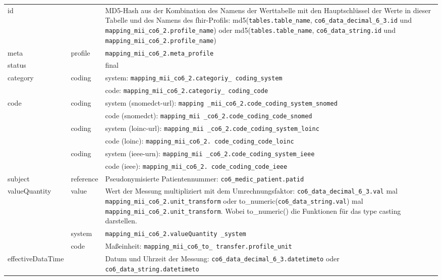 \begin{longtable}{|l|l|p{7.5cm}|} 
	\hline
	\rowcolor{lightgray} \multicolumn{3}{|l|}{Data Mapping (inhaltlich) - numerische und String Werte} \\ \hline
	id &  & MD5-Hash aus der Kombination des Namens der Werttabelle mit den Hauptschlüssel der Werte in dieser Tabelle und des Namens des \ac{fhir}-Profils: md5(\texttt{tables.table\_name}, \texttt{co6\_data\_decimal\_6\_3.id} und \texttt{mapping\_mii\_co6\_2.profile\_name}) oder md5(\texttt{tables.table\_name}, \texttt{co6\_data\_string.id} und \texttt{mapping\_mii\_co6\_2.profile\_name}) \\ \hline
	meta & profile & \texttt{mapping\_mii\_co6\_2.meta\_profile} \\ \hline 
	status &  & final  \\ \hline 
	category & coding & system: \texttt{mapping\_mii\_co6\_2.categoriy\_ coding\_system} \\ 
	\cline{3-3}
	& & code: \texttt{mapping\_mii\_co6\_2.categoriy\_ coding\_code} \\ \hline
	code & coding & system (\ac{snomedct}-\acs{url}): \texttt{mapping \_mii\_co6\_2.code\_coding\_system\_snomed} \\ 
	\cline{3-3} 
	 &   & code (\ac{snomedct}): \texttt{mapping\_mii \_co6\_2.code\_coding\_code\_snomed} \\
	 \cline{2-3} 
	 &  coding & system (\ac{loinc}-\ac{url}): \texttt{mapping\_mii \_co6\_2.code\_coding\_system\_loinc} \\ 
	 \cline{3-3} 
	  &  & code (\ac{loinc}): \texttt{mapping\_mii\_co6\_2. code\_coding\_code\_loinc} \\ 
	 \cline{2-3} 
	  & coding & system (\ac{ieee}-\acs{urn}): \texttt{mapping\_mii \_co6\_2.code\_coding\_system\_ieee} \\ 
	 \cline{3-3} 
	 &  & code (\ac{ieee}): \texttt{mapping\_mii\_co6\_2. code\_coding\_code\_ieee} \\ \hline
	subject & reference & Pseudonymisierte Patientennummer: \texttt{co6\_medic\_patient.patid} \\ \hline
	valueQuantity & value & Wert der Messung multipliziert mit dem Umrechnungsfaktor: \texttt{co6\_data\_decimal\_6\_3.val} mal \texttt{mapping\_mii\_co6\_2.unit\_transform} oder to\_numeric(\texttt{co6\_data\_string.val}) mal \texttt{mapping\_mii\_co6\_2.unit\_transform}. Wobei to\_numeric() die Funktionen für das type casting darstellen.\\
	 \cline{2-3}
	 & system & \texttt{mapping\_mii\_co6\_2.valueQuantity \_system} \\ 
	 \cline{2-3}
	 & code & Maßeinheit: \texttt{mapping\_mii\_co6\_to\_ transfer.profile\_unit}\\ \hline
    effectiveDataTime & & Datum und Uhrzeit der Messung: \texttt{co6\_data\_decimal\_6\_3.datetimeto} oder \texttt{co6\_data\_string.datetimeto} \\  \hline
\end{longtable}


